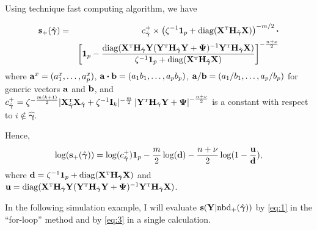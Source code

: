 \documentclass[
]{book}
\begin{document}
Using technique fast computing algorithm, we have

\begin{eqnarray}
{\bf s}_+(\hat{\boldsymbol \gamma}) &=& c_{\hat{\boldsymbol \gamma}}^+\times \left(\zeta^{-1}{\boldsymbol 1}_p+{\rm diag}({\bf X}^{{ \mathrm{\scriptscriptstyle T} }}{\bf H}_{\hat{{\boldsymbol \gamma}}}{\bf X})\right)^{-m/2}\boldsymbol{\cdot}\\
&&\left[{\boldsymbol 1}_p - \frac{{\rm diag}({\bf X}^{{ \mathrm{\scriptscriptstyle T} }}{\bf H}_{\hat{{\boldsymbol \gamma}}}{\bf Y}({\bf Y}^{{ \mathrm{\scriptscriptstyle T} }}{\bf H}_{\hat{{\boldsymbol \gamma}}}{\bf Y}+{\boldsymbol \Psi})^{-1}{\bf Y}^{{ \mathrm{\scriptscriptstyle T} }}{\bf H}_{\hat{{\boldsymbol \gamma}}}{\bf X})}{\zeta^{-1}{\boldsymbol 1}_p+{\rm diag}({\bf X}^{{ \mathrm{\scriptscriptstyle T} }}{\bf H}_{\hat{{\boldsymbol \gamma}}}{\bf X})}\right]^{-\frac{n+\nu}{2}}\label{eq:2}
\end{eqnarray}
where \({\bf a}^x = (a_1^x,\ldots,a_p^x)\), \({\bf a}\boldsymbol{\cdot}{\bf b}= (a_1b_1,\ldots,a_pb_p)\), \({\bf a}/{\bf b}= (a_1/b_1,\ldots,a_p/b_p)\) for generic vectors \({\bf a}\) and \({\bf b}\), and \(c_{\hat{\boldsymbol \gamma}}^+= {\zeta}^{-\frac{m(k+1)}{2}}|{\bf X}_{\hat{\boldsymbol \gamma}}^{{ \mathrm{\scriptscriptstyle T} }}{\bf X}_{\hat{\boldsymbol \gamma}}+\zeta^{-1}{\bf I}_{k}|^{-\frac{m}{2}}\left|{\bf Y}^{{ \mathrm{\scriptscriptstyle T} }}{\bf H}_{\hat{{\boldsymbol \gamma}}}{\bf Y}+{\boldsymbol \Psi}\right|^{-\frac{n+\nu}{2}}\) is a constant with respect to \(i\notin \hat{\boldsymbol \gamma}\).

Hence,
\begin{eqnarray}
\log({\bf s}_+(\hat{\boldsymbol \gamma})) = \log(c_{\hat{\boldsymbol \gamma}}^+){\boldsymbol 1}_p-\frac{m}{2}\log({\bf d})-\frac{n+\nu}{2}\log(1-\frac{{\bf u}}{{\bf d}}),\label{eq:3}
\end{eqnarray}
where \({\bf d}= \zeta^{-1}{\boldsymbol 1}_p+{\rm diag}({\bf X}^{{ \mathrm{\scriptscriptstyle T} }}{\bf H}_{\hat{{\boldsymbol \gamma}}}{\bf X})\) and \({\bf u}={\rm diag}({\bf X}^{{ \mathrm{\scriptscriptstyle T} }}{\bf H}_{\hat{{\boldsymbol \gamma}}}{\bf Y}({\bf Y}^{{ \mathrm{\scriptscriptstyle T} }}{\bf H}_{\hat{{\boldsymbol \gamma}}}{\bf Y}+{\boldsymbol \Psi})^{-1}{\bf Y}^{{ \mathrm{\scriptscriptstyle T} }}{\bf H}_{\hat{{\boldsymbol \gamma}}}{\bf X})\).

In the following simulation example, I will evaluate \({\bf s}({\bf Y}|{\text{nbd}}_+(\hat{\boldsymbol \gamma}))\) by \eqref{eq:1} in the ``for-loop'' method and by \eqref{eq:3} in a single calculation.
\end{document}
